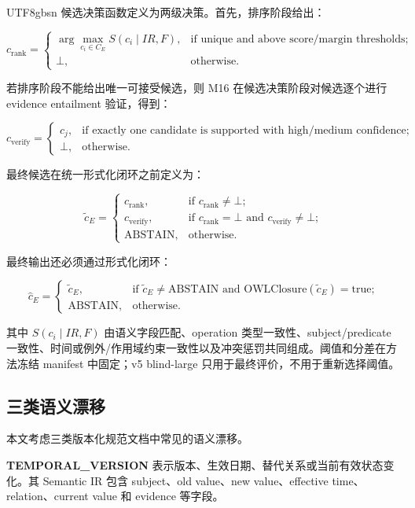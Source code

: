 \documentclass[11pt]{article}
\begin{document}
\begin{CJK*}{UTF8}{gbsn}
候选决策函数定义为两级决策。首先，排序阶段给出：

\[
c_{\mathrm{rank}} =
\begin{cases}
\arg\max_{c_i\in C_E} S(c_i\mid IR,F), & \text{if unique and above score/margin thresholds};\\
\bot, & \text{otherwise}.
\end{cases}
\]

若排序阶段不能给出唯一可接受候选，则 M16 在候选决策阶段对候选逐个进行 evidence entailment 验证，得到：

\[
c_{\mathrm{verify}} =
\begin{cases}
c_j, & \text{if exactly one candidate is supported with high/medium confidence};\\
\bot, & \text{otherwise}.
\end{cases}
\]

最终候选在统一形式化闭环之前定义为：

\[
\tilde{c}_E =
\begin{cases}
c_{\mathrm{rank}}, & \text{if } c_{\mathrm{rank}}\neq\bot;\\
c_{\mathrm{verify}}, & \text{if } c_{\mathrm{rank}}=\bot \text{ and } c_{\mathrm{verify}}\neq\bot;\\
\mathrm{ABSTAIN}, & \text{otherwise}.
\end{cases}
\]

最终输出还必须通过形式化闭环：

\[
\hat{c}_E =
\begin{cases}
\tilde{c}_E, & \text{if } \tilde{c}_E\neq\mathrm{ABSTAIN} \text{ and } \mathrm{OWLClosure}(\tilde{c}_E)=\mathrm{true};\\
\mathrm{ABSTAIN}, & \text{otherwise}.
\end{cases}
\]

其中 $S(c_i\mid IR,F)$ 由语义字段匹配、operation 类型一致性、subject/predicate 一致性、时间或例外/作用域约束一致性以及冲突惩罚共同组成。阈值和分差在方法冻结 manifest 中固定；v5 blind-large 只用于最终评价，不用于重新选择阈值。

\subsection{三类语义漂移}

本文考虑三类版本化规范文档中常见的语义漂移。

\textbf{TEMPORAL\_VERSION} 表示版本、生效日期、替代关系或当前有效状态变化。其 Semantic IR 包含 subject、old value、new value、effective time、relation、current value 和 evidence 等字段。


\end{CJK*}
\end{document}
